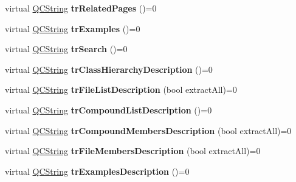 \begin{DoxyCompactItemize}
\mbox{\label{class_translator_a9211862fab0f3438ac948b60175c3a8f}} 
virtual \mbox{\hyperlink{class_q_c_string}{Q\+C\+String}} {\bfseries tr\+Related\+Pages} ()=0
\item 
\mbox{\label{class_translator_ad0aac429d4bcd4489a41e395c5244976}} 
virtual \mbox{\hyperlink{class_q_c_string}{Q\+C\+String}} {\bfseries tr\+Examples} ()=0
\item 
\mbox{\label{class_translator_a2069e8807c39f57f4e665367d3e214d0}} 
virtual \mbox{\hyperlink{class_q_c_string}{Q\+C\+String}} {\bfseries tr\+Search} ()=0
\item 
\mbox{\label{class_translator_a05c4c5ca2361559b5424e6dbadcbdf5c}} 
virtual \mbox{\hyperlink{class_q_c_string}{Q\+C\+String}} {\bfseries tr\+Class\+Hierarchy\+Description} ()=0
\item 
\mbox{\label{class_translator_a30b48fc385dd9707a52622ffebc4392e}} 
virtual \mbox{\hyperlink{class_q_c_string}{Q\+C\+String}} {\bfseries tr\+File\+List\+Description} (bool extract\+All)=0
\item 
\mbox{\label{class_translator_a031a3a5017a0548c73bb764c7a6b24f4}} 
virtual \mbox{\hyperlink{class_q_c_string}{Q\+C\+String}} {\bfseries tr\+Compound\+List\+Description} ()=0
\item 
\mbox{\label{class_translator_a3f5797671f227e6a206aaa866973fcb2}} 
virtual \mbox{\hyperlink{class_q_c_string}{Q\+C\+String}} {\bfseries tr\+Compound\+Members\+Description} (bool extract\+All)=0
\item 
\mbox{\label{class_translator_ace231b43d772f05ca59d0aa18cbdd51b}} 
virtual \mbox{\hyperlink{class_q_c_string}{Q\+C\+String}} {\bfseries tr\+File\+Members\+Description} (bool extract\+All)=0
\item 
\mbox{\label{class_translator_a6f98d005e7b74f9d189abc30e3d48e6c}} 
virtual \mbox{\hyperlink{class_q_c_string}{Q\+C\+String}} {\bfseries tr\+Examples\+Description} ()=0
\item 
\mbox{\label{class_translator_a69514c5a8d25925e7cd60245ca5e8e73}} 

\end{DoxyCompactItemize}

